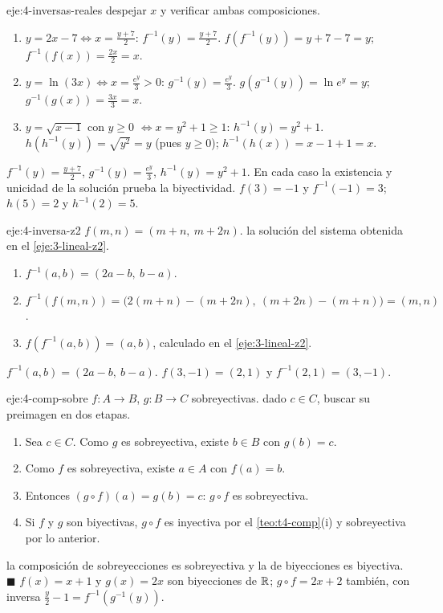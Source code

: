 \begin{solucion}{eje:4-inversas-reales}
\planteamiento despejar $x$ y verificar ambas composiciones.
\pasos
\begin{enumerate}[label=(\alph*)]
  \item $y=2x-7\iff x=\tfrac{y+7}{2}$: $f^{-1}(y)=\tfrac{y+7}{2}$. $f(f^{-1}(y))=y+7-7=y$; $f^{-1}(f(x))=\tfrac{2x}{2}=x$.
  \item $y=\ln(3x)\iff x=\tfrac{e^{y}}{3}>0$: $g^{-1}(y)=\tfrac{e^{y}}{3}$. $g(g^{-1}(y))=\ln e^{y}=y$; $g^{-1}(g(x))=\tfrac{3x}{3}=x$.
  \item $y=\sqrt{x-1}$ con $y\ge0$ $\iff x=y^{2}+1\ge1$: $h^{-1}(y)=y^{2}+1$. $h(h^{-1}(y))=\sqrt{y^{2}}=y$ (pues $y\ge0$); $h^{-1}(h(x))=x-1+1=x$.
\end{enumerate}
\resultado $f^{-1}(y)=\tfrac{y+7}{2}$, $g^{-1}(y)=\tfrac{e^{y}}{3}$, $h^{-1}(y)=y^{2}+1$. En cada caso la existencia y unicidad de la solución prueba la biyectividad.
\comprobacion $f(3)=-1$ y $f^{-1}(-1)=3$; $h(5)=2$ y $h^{-1}(2)=5$.
\end{solucion}

\begin{solucion}{eje:4-inversa-z2}
\datos $f(m,n)=(m+n,\ m+2n)$.
\planteamiento la solución del sistema obtenida en el \cref{eje:3-lineal-z2}.
\pasos
\begin{enumerate}[label=\arabic*.]
  \item $f^{-1}(a,b)=(2a-b,\ b-a)$.
  \item $f^{-1}(f(m,n))=\bigl(2(m+n)-(m+2n),\ (m+2n)-(m+n)\bigr)=(m,n)$.
  \item $f(f^{-1}(a,b))=(a,b)$, calculado en el \cref{eje:3-lineal-z2}.
\end{enumerate}
\resultado $f^{-1}(a,b)=(2a-b,\ b-a)$.
\comprobacion $f(3,-1)=(2,1)$ y $f^{-1}(2,1)=(3,-1)$.
\end{solucion}

\begin{solucion}{eje:4-comp-sobre}
\datos $f\colon A\to B$, $g\colon B\to C$ sobreyectivas.
\planteamiento dado $c\in C$, buscar su preimagen en dos etapas.
\pasos
\begin{enumerate}[label=\arabic*.]
  \item Sea $c\in C$. Como $g$ es sobreyectiva, existe $b\in B$ con $g(b)=c$.
  \item Como $f$ es sobreyectiva, existe $a\in A$ con $f(a)=b$.
  \item Entonces $(g\circ f)(a)=g(b)=c$: $g\circ f$ es sobreyectiva.
  \item Si $f$ y $g$ son biyectivas, $g\circ f$ es inyectiva por el \cref{teo:t4-comp}(i) y sobreyectiva por lo anterior.
\end{enumerate}
\resultado la composición de sobreyecciones es sobreyectiva y la de biyecciones es biyectiva. \hfill$\blacksquare$
\comprobacion $f(x)=x+1$ y $g(x)=2x$ son biyecciones de $\mathbb{R}$; $g\circ f=2x+2$ también, con inversa $\tfrac y2-1=f^{-1}(g^{-1}(y))$.
\end{solucion}

